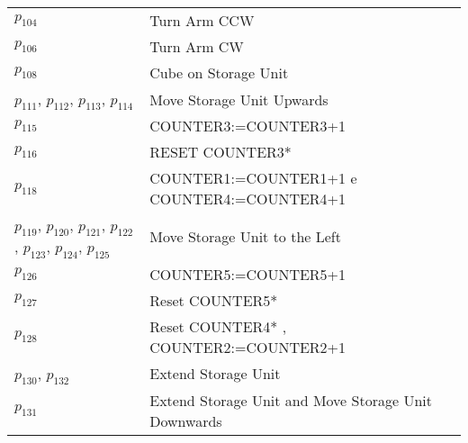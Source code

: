 \begin{longtable}{M{5cm}M{10cm}}
\hyperlink{completeNet:p104}{\hypertarget{completeTable:p104}{$p_{104}$}} & Turn Arm CCW\\
\hyperlink{completeNet:p106}{\hypertarget{completeTable:p106}{$p_{106}$}} & Turn Arm CW\\
\hyperlink{completeNet:p108}{\hypertarget{completeTable:p108}{$p_{108}$}} & Cube on Storage Unit\\
\hyperlink{completeNet:p111}{\hypertarget{completeTable:p111}{$p_{111}$}}, \hyperlink{completeNet:p112}{\hypertarget{completeTable:p112}{$p_{112}$}}, \hyperlink{completeNet:p113}{\hypertarget{completeTable:p113}{$p_{113}$}}, \hyperlink{completeNet:p114}{\hypertarget{completeTable:p114}{$p_{114}$}} & Move Storage Unit Upwards\\
\hyperlink{completeNet:p115}{\hypertarget{completeTable:p115}{$p_{115}$}} & COUNTER3:=COUNTER3+1\\
\hyperlink{completeNet:p116}{\hypertarget{completeTable:p116}{$p_{116}$}} & RESET COUNTER3*\\
\hyperlink{completeNet:p118}{\hypertarget{completeTable:p118}{$p_{118}$}} & COUNTER1:=COUNTER1+1 e COUNTER4:=COUNTER4+1\\
\hyperlink{completeNet:p119}{\hypertarget{completeTable:p119}{$p_{119}$}}, \hyperlink{completeNet:p120}{\hypertarget{completeTable:p120}{$p_{120}$}}, \hyperlink{completeNet:p121}{\hypertarget{completeTable:p121}{$p_{121}$}}, \hyperlink{completeNet:p122}{\hypertarget{completeTable:p122}{$p_{122}$}}, \hyperlink{completeNet:p123}{\hypertarget{completeTable:p123}{$p_{123}$}}, \hyperlink{completeNet:p124}{\hypertarget{completeTable:p124}{$p_{124}$}}, \hyperlink{completeNet:p125}{\hypertarget{completeTable:p125}{$p_{125}$}} & Move Storage Unit to the Left\\
\hyperlink{completeNet:p126}{\hypertarget{completeTable:p126}{$p_{126}$}} & COUNTER5:=COUNTER5+1\\
\hyperlink{completeNet:p127}{\hypertarget{completeTable:p127}{$p_{127}$}} & Reset COUNTER5*\\
\hyperlink{completeNet:p128}{\hypertarget{completeTable:p128}{$p_{128}$}} & Reset COUNTER4* , COUNTER2:=COUNTER2+1\\
\hyperlink{completeNet:p130}{\hypertarget{completeTable:p130}{$p_{130}$}}, \hyperlink{completeNet:p132}{\hypertarget{completeTable:p132}{$p_{132}$}} & Extend Storage Unit\\
\hyperlink{completeNet:p131}{\hypertarget{completeTable:p131}{$p_{131}$}} & Extend Storage Unit and Move Storage Unit Downwards\\

\end{longtable}

